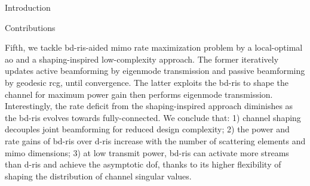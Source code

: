 \begin{section}{Introduction}
\begin{subsection}{Contributions}



		Fifth, we tackle \gls{bd}-\gls{ris}-aided \gls{mimo} rate maximization problem by a local-optimal \gls{ao} and a shaping-inspired low-complexity approach.
		The former iteratively updates active beamforming by eigenmode transmission and passive beamforming by geodesic \gls{rcg}, until convergence.
		The latter exploits the \gls{bd}-\gls{ris} to shape the channel for maximum power gain then performs eigenmode transmission.
		Interestingly, the rate deficit from the shaping-inspired approach diminishes as the \gls{bd}-\gls{ris} evolves towards fully-connected.
		We conclude that: 1) channel shaping decouples joint beamforming for reduced design complexity; 2) the power and rate gains of \gls{bd}-\gls{ris} over \gls{d}-\gls{ris} increase with the number of scattering elements and \gls{mimo} dimensions; 3) at low transmit power, \gls{bd}-\gls{ris} can activate more streams than \gls{d}-\gls{ris} and achieve the asymptotic \gls{dof}, thanks to its higher flexibility of shaping the distribution of channel singular values.




\end{subsection}
\end{section}
